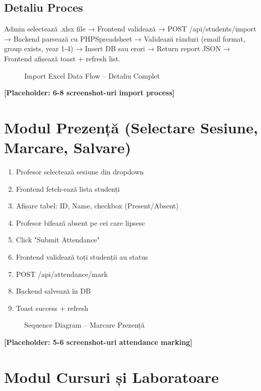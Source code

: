 \subsection{Detaliu Proces}

Admin selectează .xlsx file → Frontend validează → POST /api/students/import → Backend parsează cu PHPSpreadsheet → Validează rânduri (email format, group exists, year 1-4) → Insert DB sau erori → Return report JSON → Frontend afișează toast + refresh list.

\begin{figure}[H]
  \centering
  \caption{Import Excel Data Flow – Detaliu Complet}
  \label{fig:import-flow}
\end{figure}

\textbf{[Placeholder: 6-8 screenshot-uri import process]}

\section{Modul Prezență (Selectare Sesiune, Marcare, Salvare)}

\begin{enumerate}
  \item Profesor selectează sesiune din dropdown
  \item Frontend fetch-ează lista studenți
  \item Afișare tabel: ID, Name, checkbox (Present/Absent)
  \item Profesor bifează absent pe cei care lipsesc
  \item Click "Submit Attendance"
  \item Frontend validează toți studenții au status
  \item POST /api/attendance/mark
  \item Backend salvează în DB
  \item Toast success + refresh
\end{enumerate}

\begin{figure}[H]
  \centering
  \caption{Sequence Diagram – Marcare Prezență}
  \label{fig:attendance}
\end{figure}

\textbf{[Placeholder: 5-6 screenshot-uri attendance marking]}

\section{Modul Cursuri și Laboratoare}


